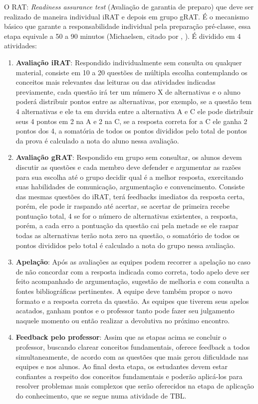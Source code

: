 O RAT: \textit{Readiness assurance test} (Avaliação de garantia de preparo) que deve ser realizado de maneira individual iRAT e depois em grupo gRAT. É o mecanismo básico que garante a responsabilidade individual pela preparação pré-classe, essa etapa equivale a 50 a 90 minutos (Michaelsen, citado por \citeauthor{bollela}, \citeyear{bollela}). É dividido em 4 atividades:

\begin{enumerate}
  \item \textbf{Avaliação iRAT}: Respondido individualmente sem consulta ou qualquer material, consiste em 10 a 20 questões de múltipla escolha contemplando os conceitos mais relevantes das leituras ou das atividades indicadas previamente, cada questão irá ter um número X de alternativas e o aluno poderá distribuir pontos entre as alternativas, por exemplo, se a questão tem 4 alternativas e ele ta em duvida entre a alternativa A e C ele pode distribuir seus 4 pontos em 2 na A e 2 na C, se a resposta correta for a C ele ganha 2 pontos dos 4, a somatória de todos os pontos divididos pelo total de pontos da prova é calculado a nota do aluno nessa avaliação.
  \item \textbf{Avaliação gRAT}: Respondido em grupo sem consultar, os alunos devem discutir as questões e cada membro deve defender e argumentar as razões para sua escolha até o grupo decidir qual é a melhor resposta, exercitando suas habilidades de comunicação, argumentação e convencimento. Consiste das mesmas questões do iRAT, terá feedbacks imediatos da resposta certa, porém, ele pode ir raspando até acertar, se acertar de primeira recebe pontuação total, 4 se for o número de alternativas existentes, a resposta, porém, a cada erro a pontuação da questão cai pela metade se ele raspar todas as alternativas terão nota zero na questão, o somatório de todos os pontos divididos pelo total é calculado a nota do grupo nessa avaliação.
  \item \textbf{Apelação}: Após as avaliações as equipes podem recorrer a apelação no caso de não concordar com a resposta indicada como correta, todo apelo deve ser feito acompanhado de argumentação, sugestão de melhoria e com consulta a fontes bibliográficas pertinentes. A equipe deve também propor o novo formato e a resposta correta da questão. As equipes que tiverem seus apelos acatados, ganham pontos e o professor tanto pode fazer seu julgamento naquele momento ou então realizar a devolutiva no próximo encontro.
  \item \textbf{Feedback pelo professor}: Assim que as etapas acima se concluir o professor, buscando clarear conceitos fundamentais, oferece feedback a todos simultaneamente, de acordo com as questões que mais gerou dificuldade nas equipes e nos alunos. Ao final desta etapa, os estudantes devem estar confiantes a respeito dos conceitos fundamentais e poderão aplicá-los para resolver problemas mais complexos que serão oferecidos na etapa de aplicação do conhecimento, que se segue numa atividade de TBL.
\end{enumerate}

